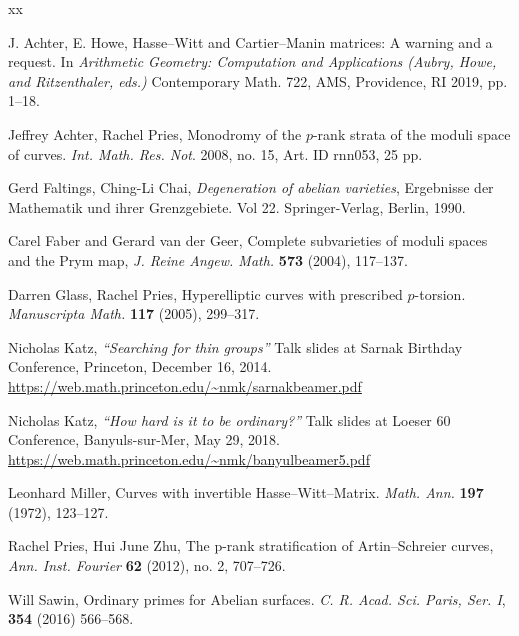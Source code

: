 \documentclass{amsart}
\theoremstyle{plain}
\theoremstyle{remark}
\theoremstyle{remark}
\newcommand{\0}{\mathbf{0}}
\newcommand{\1}{\mathbf{1}}
\begin{document}
\begin{thebibliography}{xx}

J. Achter, E. Howe,
Hasse--Witt and Cartier--Manin matrices:
A warning and a request.
In {\it Arithmetic Geometry:
Computation and Applications (Aubry, Howe, and Ritzenthaler, eds.)}
Contemporary Math. 722,
AMS, Providence, RI 2019, pp. 1--18.

Jeffrey Achter, Rachel Pries,
Monodromy of the $p$-rank strata of the moduli space of curves.
{\it Int. Math. Res. Not}. 2008, no. 15, Art. ID rnn053, 25 pp. 

Gerd Faltings, Ching-Li Chai,
{\it Degeneration of abelian varieties}, 
Ergebnisse der Mathematik und ihrer Grenzgebiete. 
Vol 22. Springer-Verlag, Berlin, 1990.

Carel Faber and Gerard van der Geer, 
Complete subvarieties of moduli spaces and the Prym map, 
{\it J. Reine Angew. Math.} {\bf 573} (2004), 117--137.

Darren Glass, Rachel Pries,
Hyperelliptic curves with prescribed $p$-torsion.
{\it Manuscripta Math.} {\bf 117} (2005), 299--317.

Nicholas Katz,
{\it ``Searching for thin groups''}
Talk slides at Sarnak Birthday Conference, 
Princeton, December 16, 2014.
\url{https://web.math.princeton.edu/~nmk/sarnakbeamer.pdf}

Nicholas Katz,
{\it ``How hard is it to be ordinary?''}
Talk slides at 
Loeser 60 Conference,
Banyuls-sur-Mer, May 29, 2018.
\url{https://web.math.princeton.edu/~nmk/banyulbeamer5.pdf}

Leonhard Miller,
Curves with invertible Hasse--Witt--Matrix.
{\it Math. Ann.} {\bf 197} (1972), 123--127.

Rachel Pries, Hui June Zhu, 
The p-rank stratification of Artin--Schreier curves, 
{\it Ann. Inst. Fourier} {\bf 62} (2012), no. 2, 707--726.

Will Sawin,
Ordinary primes for Abelian surfaces.
{\it C. R. Acad. Sci. Paris, Ser. I},  {\bf 354} (2016) 566--568.

\end{thebibliography}
\end{document}
